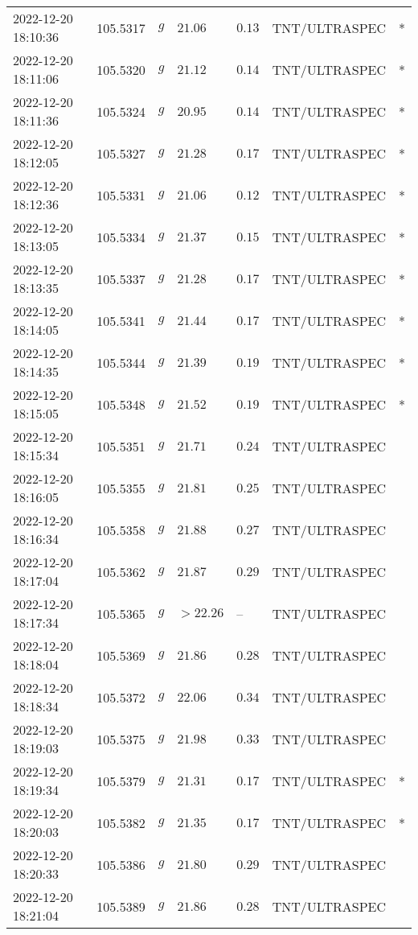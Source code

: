 \documentclass{nature_plusfigure}
\begin{document}
\begin{supplement}
\begin{center}
\begin{longtable}{lllllll}
2022-12-20 18:10:36 & 105.5317 & $g$ & $21.06$ & $0.13$ & TNT/ULTRASPEC & * \\ 
2022-12-20 18:11:06 & 105.5320 & $g$ & $21.12$ & $0.14$ & TNT/ULTRASPEC & * \\ 
2022-12-20 18:11:36 & 105.5324 & $g$ & $20.95$ & $0.14$ & TNT/ULTRASPEC & * \\ 
2022-12-20 18:12:05 & 105.5327 & $g$ & $21.28$ & $0.17$ & TNT/ULTRASPEC & * \\ 
2022-12-20 18:12:36 & 105.5331 & $g$ & $21.06$ & $0.12$ & TNT/ULTRASPEC & * \\ 
2022-12-20 18:13:05 & 105.5334 & $g$ & $21.37$ & $0.15$ & TNT/ULTRASPEC & * \\ 
2022-12-20 18:13:35 & 105.5337 & $g$ & $21.28$ & $0.17$ & TNT/ULTRASPEC & * \\ 
2022-12-20 18:14:05 & 105.5341 & $g$ & $21.44$ & $0.17$ & TNT/ULTRASPEC & * \\ 
2022-12-20 18:14:35 & 105.5344 & $g$ & $21.39$ & $0.19$ & TNT/ULTRASPEC & * \\ 
2022-12-20 18:15:05 & 105.5348 & $g$ & $21.52$ & $0.19$ & TNT/ULTRASPEC & * \\ 
2022-12-20 18:15:34 & 105.5351 & $g$ & $21.71$ & $0.24$ & TNT/ULTRASPEC &  \\ 
2022-12-20 18:16:05 & 105.5355 & $g$ & $21.81$ & $0.25$ & TNT/ULTRASPEC &  \\ 
2022-12-20 18:16:34 & 105.5358 & $g$ & $21.88$ & $0.27$ & TNT/ULTRASPEC &  \\ 
2022-12-20 18:17:04 & 105.5362 & $g$ & $21.87$ & $0.29$ & TNT/ULTRASPEC &  \\ 
2022-12-20 18:17:34 & 105.5365 & $g$ & $>22.26$ & -- & TNT/ULTRASPEC &  \\ 
2022-12-20 18:18:04 & 105.5369 & $g$ & $21.86$ & $0.28$ & TNT/ULTRASPEC &  \\ 
2022-12-20 18:18:34 & 105.5372 & $g$ & $22.06$ & $0.34$ & TNT/ULTRASPEC &  \\ 
2022-12-20 18:19:03 & 105.5375 & $g$ & $21.98$ & $0.33$ & TNT/ULTRASPEC &  \\ 
2022-12-20 18:19:34 & 105.5379 & $g$ & $21.31$ & $0.17$ & TNT/ULTRASPEC & * \\ 
2022-12-20 18:20:03 & 105.5382 & $g$ & $21.35$ & $0.17$ & TNT/ULTRASPEC & * \\ 
2022-12-20 18:20:33 & 105.5386 & $g$ & $21.80$ & $0.29$ & TNT/ULTRASPEC &  \\ 
2022-12-20 18:21:04 & 105.5389 & $g$ & $21.86$ & $0.28$ & TNT/ULTRASPEC &  \\ 

\end{longtable}
\end{center}
\end{supplement}
\end{document}
